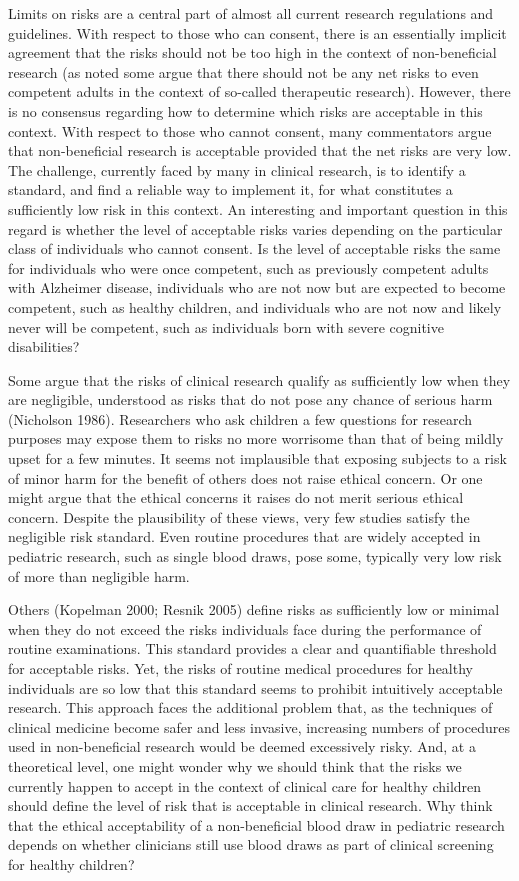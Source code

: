 \documentclass[12p]{article}
\begin{document}
 Limits on risks are a central part of almost all current research regulations and guidelines. With respect to those who can consent, there is an essentially implicit agreement that the risks should not be too high in the context of non-beneficial research (as noted some argue that there should not be any net risks to even competent adults in the context of so-called therapeutic research). However, there is no consensus regarding how to determine which risks are acceptable in this context. With respect to those who cannot consent, many commentators argue that non-beneficial research is acceptable provided that the net risks are very low. The challenge, currently faced by many in clinical research, is to identify a standard, and find a reliable way to implement it, for what constitutes a sufficiently low risk in this context. An interesting and important question in this regard is whether the level of acceptable risks varies depending on the particular class of individuals who cannot consent. Is the level of acceptable risks the same for individuals who were once competent, such as previously competent adults with Alzheimer disease, individuals who are not now but are expected to become competent, such as healthy children, and individuals who are not now and likely never will be competent, such as individuals born with severe cognitive disabilities?

Some argue that the risks of clinical research qualify as sufficiently low when they are negligible, understood as risks that do not pose any chance of serious harm (Nicholson 1986). Researchers who ask children a few questions for research purposes may expose them to risks no more worrisome than that of being mildly upset for a few minutes. It seems not implausible that exposing subjects to a risk of minor harm for the benefit of others does not raise ethical concern. Or one might argue that the ethical concerns it raises do not merit serious ethical concern. Despite the plausibility of these views, very few studies satisfy the negligible risk standard. Even routine procedures that are widely accepted in pediatric research, such as single blood draws, pose some, typically very low risk of more than negligible harm.

Others (Kopelman 2000; Resnik 2005) define risks as sufficiently low or minimal when they do not exceed the risks individuals face during the performance of routine examinations. This standard provides a clear and quantifiable threshold for acceptable risks. Yet, the risks of routine medical procedures for healthy individuals are so low that this standard seems to prohibit intuitively acceptable research. This approach faces the additional problem that, as the techniques of clinical medicine become safer and less invasive, increasing numbers of procedures used in non-beneficial research would be deemed excessively risky. And, at a theoretical level, one might wonder why we should think that the risks we currently happen to accept in the context of clinical care for healthy children should define the level of risk that is acceptable in clinical research. Why think that the ethical acceptability of a non-beneficial blood draw in pediatric research depends on whether clinicians still use blood draws as part of clinical screening for healthy children?
\end{document}
